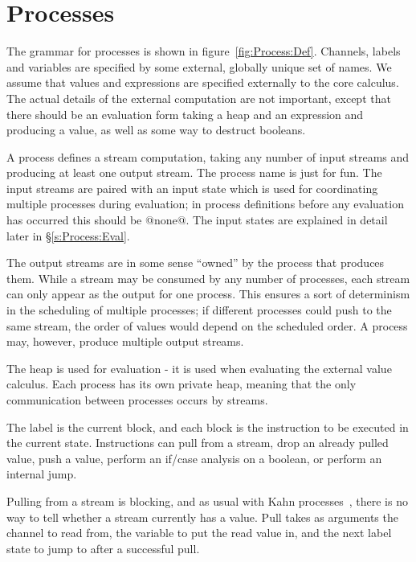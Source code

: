 \section{Processes}
\label{s:Processes}




The grammar for processes is shown in figure~\ref{fig:Process:Def}.
Channels, labels and variables are specified by some external, globally unique set of names.
We assume that values and expressions are specified externally to the core calculus.
The actual details of the external computation are not important, except that there should be an evaluation form taking a heap and an expression and producing a value, as well as some way to destruct booleans.

A process defines a stream computation, taking any number of input streams and producing at least one output stream.
The process name is just for fun.
The input streams are paired with an input state which is used for coordinating multiple processes during evaluation; in process definitions before any evaluation has occurred this should be @none@.
The input states are explained in detail later in \S\ref{s:Process:Eval}.

The output streams are in some sense ``owned'' by the process that produces them.
While a stream may be consumed by any number of processes, each stream can only appear as the output for one process.
This ensures a sort of determinism in the scheduling of multiple processes; if different processes could push to the same stream, the order of values would depend on the scheduled order.
A process may, however, produce multiple output streams.

The heap is used for evaluation - it is used when evaluating the external value calculus.
Each process has its own private heap, meaning that the only communication between processes occurs by streams.

The label is the current block, and each block is the instruction to be executed in the current state.
Instructions can pull from a stream, drop an already pulled value, push a value, perform an if/case analysis on a boolean, or perform an internal jump.

Pulling from a stream is blocking, and as usual with Kahn processes~\cite{kahn1976coroutines}, there is no way to tell whether a stream currently has a value.
Pull takes as arguments the channel to read from, the variable to put the read value in, and the next label state to jump to after a successful pull.

